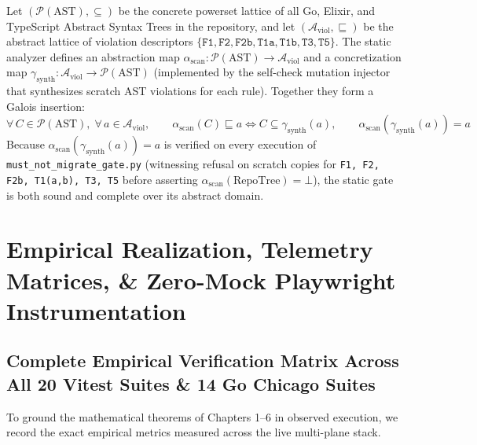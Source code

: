 \documentclass[10pt,twoside,openany]{book}
\theoremstyle{plain}
\theoremstyle{definition}
\theoremstyle{remark}
\begin{document}
Let $(\mathcal{P}(\mathrm{AST}), \subseteq)$ be the concrete powerset lattice of all Go, Elixir, and TypeScript Abstract Syntax Trees in the repository, and let $(\mathcal{A}_{\mathrm{viol}}, \sqsubseteq)$ be the abstract lattice of violation descriptors $\{\mathtt{F1}, \mathtt{F2}, \mathtt{F2b}, \mathtt{T1a}, \mathtt{T1b}, \mathtt{T3}, \mathtt{T5}\}$. The static analyzer defines an abstraction map $\alpha_{\mathrm{scan}}: \mathcal{P}(\mathrm{AST}) \to \mathcal{A}_{\mathrm{viol}}$ and a concretization map $\gamma_{\mathrm{synth}}: \mathcal{A}_{\mathrm{viol}} \to \mathcal{P}(\mathrm{AST})$ (implemented by the self-check mutation injector that synthesizes scratch AST violations for each rule). Together they form a Galois insertion:
\begin{equation}
\forall\, C \in \mathcal{P}(\mathrm{AST}),\; \forall\, a \in \mathcal{A}_{\mathrm{viol}},\qquad \alpha_{\mathrm{scan}}(C) \sqsubseteq a \iff C \subseteq \gamma_{\mathrm{synth}}(a), \qquad \alpha_{\mathrm{scan}}(\gamma_{\mathrm{synth}}(a)) = a
\end{equation}
Because $\alpha_{\mathrm{scan}}(\gamma_{\mathrm{synth}}(a)) = a$ is verified on every execution of \texttt{must\_not\_migrate\_gate.py} (witnessing refusal on scratch copies for \texttt{F1, F2, F2b, T1(a,b), T3, T5} before asserting $\alpha_{\mathrm{scan}}(\mathrm{RepoTree}) = \bot$), the static gate is both sound and complete over its abstract domain.

\chapter{Empirical Realization, Telemetry Matrices, \& Zero-Mock Playwright Instrumentation}

\section{Complete Empirical Verification Matrix Across All 20 Vitest Suites \& 14 Go Chicago Suites}
To ground the mathematical theorems of Chapters 1--6 in observed execution, we record the exact empirical metrics measured across the live multi-plane stack.
\end{document}

